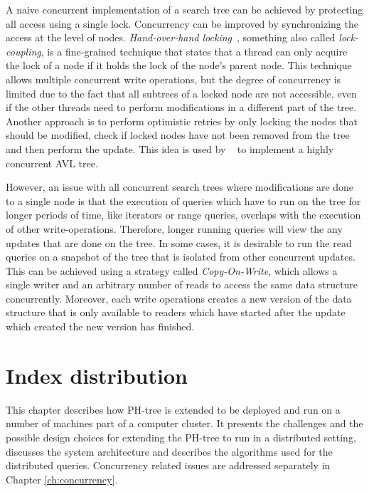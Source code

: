 \documentclass[11pt,a4paper]{globis-book}
\begin{document}
A naive concurrent implementation of a search tree can be achieved by protecting all access using a single lock. Concurrency can be improved by synchronizing the access at the level of nodes. \textit{Hand-over-hand locking}~\cite{shanir04}, something also called \textit{lock-coupling}, is a fine-grained technique that states that a thread can only acquire the lock of a node if it holds the lock of the node's parent node. This technique allows multiple concurrent write operations, but the degree of concurrency is limited due to the fact that all subtrees of a locked node are not accessible, even if the other threads need to perform modifications in a different part of the tree. Another approach is to perform optimistic retries by only locking the nodes that should be modified, check if locked nodes have not been removed from the tree and then perform the update. This idea is used by ~\cite{Bronson2010concurrent} to implement a highly concurrent AVL tree.

However, an issue with all concurrent search trees where modifications are done to a single node is that the execution of queries which have to run on the tree for longer periods of time, like iterators or range queries, overlaps with the execution of other write-operations. Therefore, longer running queries will view the any updates that are done on the tree. In some cases, it is desirable to run the read queries on a snapshot of the tree that is isolated from other concurrent updates. This can be achieved using a strategy called \textit{Copy-On-Write}, which allows a single writer and an arbitrary number of reads to access the same data structure concurrently. Moreover, each write operations creates a new version of the data structure that is only available to readers which have started after the update which created the new version has finished. 

\chapter{Index distribution}
\label{ch:distindex}

This chapter describes how PH-tree is extended to be deployed and run on a number of machines part of a computer cluster. It presents the challenges and the possible design choices for extending the PH-tree to run in a distributed setting, discusses the system architecture and describes the algorithms used for the distributed queries. Concurrency related issues are addressed separately in Chapter \ref{ch:concurrency}.
\end{document}
